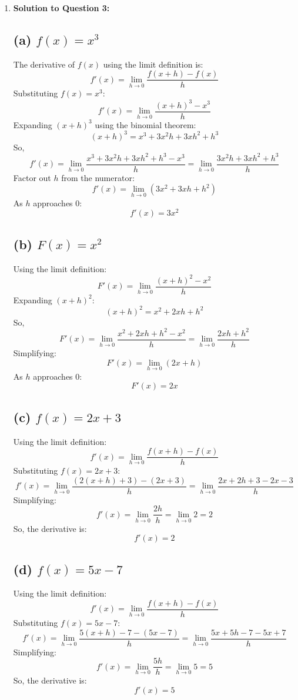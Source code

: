 \documentclass{article}
\begin{document}
\begin{enumerate}[itemsep=20pt]
    \item \textbf{Solution to Question 3:}
    \subsection*{(a) \( f(x) = x^3 \)}

The derivative of \( f(x) \) using the limit definition is:
\[
f'(x) = \lim_{h \to 0} \frac{f(x+h) - f(x)}{h}
\]
Substituting \( f(x) = x^3 \):
\[
f'(x) = \lim_{h \to 0} \frac{(x+h)^3 - x^3}{h}
\]
Expanding \( (x+h)^3 \) using the binomial theorem:
\[
(x+h)^3 = x^3 + 3x^2h + 3xh^2 + h^3
\]
So,
\[
f'(x) = \lim_{h \to 0} \frac{x^3 + 3x^2h + 3xh^2 + h^3 - x^3}{h} = \lim_{h \to 0} \frac{3x^2h + 3xh^2 + h^3}{h}
\]
Factor out \( h \) from the numerator:
\[
f'(x) = \lim_{h \to 0} \left(3x^2 + 3xh + h^2\right)
\]
As \( h \) approaches 0:
\[
f'(x) = 3x^2
\]
\subsection*{(b) \( F(x) = x^2 \)}
Using the limit definition:
\[
F'(x) = \lim_{h \to 0} \frac{(x+h)^2 - x^2}{h}
\]
Expanding \( (x+h)^2 \):
\[
(x+h)^2 = x^2 + 2xh + h^2
\]
So,
\[
F'(x) = \lim_{h \to 0} \frac{x^2 + 2xh + h^2 - x^2}{h} = \lim_{h \to 0} \frac{2xh + h^2}{h}
\]
Simplifying:
\[
F'(x) = \lim_{h \to 0} \left(2x + h\right)
\]
As \( h \) approaches 0:
\[
F'(x) = 2x
\]

\subsection*{(c) \( f(x) = 2x + 3 \)}

Using the limit definition:
\[
f'(x) = \lim_{h \to 0} \frac{f(x+h) - f(x)}{h}
\]
Substituting \( f(x) = 2x + 3 \):
\[
f'(x) = \lim_{h \to 0} \frac{(2(x+h) + 3) - (2x + 3)}{h} = \lim_{h \to 0} \frac{2x + 2h + 3 - 2x - 3}{h}
\]
Simplifying:
\[
f'(x) = \lim_{h \to 0} \frac{2h}{h} = \lim_{h \to 0} 2 = 2
\]
So, the derivative is:
\[
f'(x) = 2
\]

\subsection*{(d) \( f(x) = 5x - 7 \)}

Using the limit definition:
\[
f'(x) = \lim_{h \to 0} \frac{f(x+h) - f(x)}{h}
\]
Substituting \( f(x) = 5x - 7 \):
\[
f'(x) = \lim_{h \to 0} \frac{5(x+h) - 7 - (5x - 7)}{h} = \lim_{h \to 0} \frac{5x + 5h - 7 - 5x + 7}{h}
\]
Simplifying:
\[
f'(x) = \lim_{h \to 0} \frac{5h}{h} = \lim_{h \to 0} 5 = 5
\]
So, the derivative is:
\[
f'(x) = 5
\]


\end{enumerate}
\end{document}
